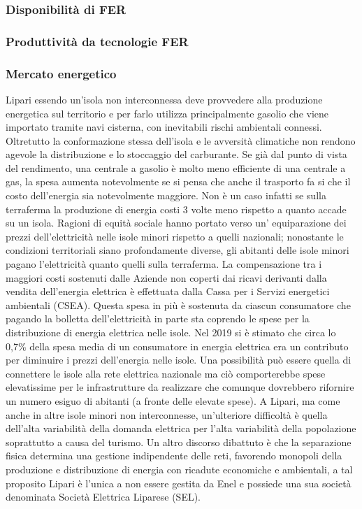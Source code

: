 \documentclass[fleqn,10pt]{SelfArx} %
\begin{document}
\subsubsection{Disponibilità di FER}
\subsubsection{Produttività da tecnologie FER}
\subsubsection{Mercato energetico}
Lipari essendo un'isola non interconnessa deve provvedere alla produzione energetica sul 
territorio e per farlo utilizza principalmente gasolio che viene importato tramite navi cisterna, con inevitabili rischi ambientali connessi. 
Oltretutto la conformazione stessa dell'isola e le avversità climatiche non rendono agevole la distribuzione e lo stoccaggio del carburante. 
Se già dal punto di vista del rendimento, una centrale a gasolio è molto meno efficiente di una centrale a gas, la spesa aumenta notevolmente se si pensa che anche il trasporto fa si che il costo dell'energia sia notevolmente maggiore. 
Non è un caso infatti se sulla terraferma la produzione di energia costi 3 volte meno rispetto a quanto accade su un isola. 
Ragioni di equità sociale hanno portato verso un' equiparazione dei prezzi dell'elettricità nelle isole minori rispetto a quelli nazionali; nonostante le condizioni territoriali siano profondamente diverse, gli abitanti delle isole minori pagano l'elettricità quanto quelli sulla terraferma. 
La compensazione tra i maggiori costi sostenuti dalle Aziende non coperti dai ricavi derivanti dalla vendita dell'energia elettrica è effettuata dalla Cassa per i Servizi energetici ambientali (CSEA). Questa spesa in più è sostenuta da ciascun consumatore che pagando la bolletta dell'elettricità in parte sta coprendo le spese per la distribuzione di energia elettrica nelle isole. 
Nel 2019 si è stimato che circa lo 0,7\% della spesa media di un consumatore in energia elettrica era un contributo per diminuire i prezzi dell'energia nelle isole. 
Una possibilità può essere quella di connettere le isole alla rete elettrica nazionale ma ciò comporterebbe spese elevatissime per le infrastrutture da realizzare che comunque dovrebbero rifornire un numero esiguo di abitanti (a fronte delle elevate spese). 
A Lipari, ma come anche in altre isole minori non interconnesse, un'ulteriore difficoltà è quella dell'alta variabilità della domanda elettrica per l'alta variabilità della popolazione soprattutto a causa del turismo. 
Un altro discorso dibattuto è che la separazione fisica determina una gestione indipendente delle reti, favorendo monopoli della produzione e distribuzione di energia con ricadute economiche e ambientali, a tal proposito Lipari è l'unica a non essere gestita da Enel e possiede una sua società denominata Società Elettrica Liparese (SEL). 
\end{document}
